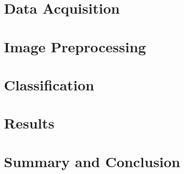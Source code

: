\documentclass[conference,table]{IEEEtran}
\begin{document}
	\section{Data Acquisition} \label{daq}
	
	
	\section{Image Preprocessing} \label{preprocessing}
	
	
	\section{Classification} \label{classifiers}
	
	
	\section{Results}
	
	
	\section{Summary and Conclusion}
	
	
\end{document}
